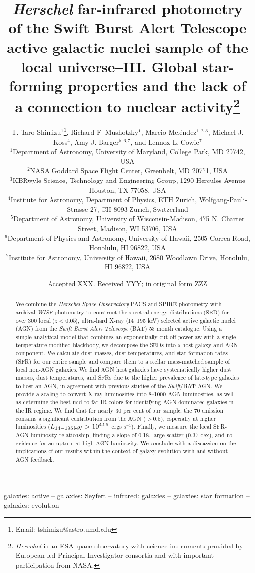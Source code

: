 \documentclass[fleqn, usenatbib]{mnras}
\title[\emph{Herschel}-BAT Sample: AGN-SF Connection]{\emph{Herschel} far-infrared photometry of the Swift Burst Alert
Telescope active galactic nuclei sample of the local universe--III. Global star-forming properties and the lack of a connection to nuclear activity\thanks{{\it Herschel} is an ESA space observatory with science instruments provided by European-led Principal Investigator consortia and with important participation from NASA.}}
\author[T. T. Shimizu]{T. Taro Shimizu$^{1}$\thanks{Email: tshimizu@astro.umd.edu}, Richard F. Mushotzky$^1$, Marcio Mel\'endez$^{1,2,3}$, Michael J. Koss$^{4}$, \newauthor Amy J. Barger$^{5,6,7}$, and Lennox L. Cowie$^{7}$\\
$^{1}$Department of Astronomy, University of Maryland, College Park, MD 20742, USA\\
$^{2}$NASA Goddard Space Flight Center,  Greenbelt, MD  20771, USA\\
$^{3}$KBRwyle Science, Technology and Engineering Group, 1290 Hercules Avenue  Houston, TX  77058, USA\\ 
$^{4}$Institute for Astronomy, Department of Physics, ETH Zurich, Wolfgang-Pauli-Strasse 27, CH-8093 Zurich, Switzerland\\
$^{5}$Department of Astronomy, University of Wisconsin-Madison, 475 N. Charter Street, Madison, WI 53706, USA\\
$^{6}$Department of Physics and Astronomy, University of Hawaii, 2505 Correa Road, Honolulu, HI 96822, USA\\
$^{7}$Institute for Astronomy, University of Hawaii, 2680 Woodlawn Drive, Honolulu, HI 96822, USA}
\date{Accepted XXX. Received YYY; in original form ZZZ}
\newcommand{\herschel}{\emph{Herschel}}
\newcommand{\swift}{\textit{Swift}}
\begin{document}
\label{firstpage}
\pagerange{\pageref{firstpage}--\pageref{lastpage}}
\maketitle

\begin{abstract}
We combine the \herschel{} \textit{Space Observatory} PACS and SPIRE photometry with archival \textit{WISE} photometry to construct the spectral energy distributions (SED) for over 300 local ($z < 0.05$), ultra-hard X-ray (14--195 keV) selected active galactic nuclei (AGN) from the \swift{} \textit{Burst Alert Telescope} (BAT) 58 month catalogue. Using a simple analytical model that combines an exponentially cut-off powerlaw with a single temperature modified blackbody, we decompose the SEDs into a host-galaxy and AGN component. We calculate dust masses, dust temperatures, and star-formation rates (SFR) for our entire sample and compare them to a stellar mass-matched sample of local non-AGN galaxies. We find AGN host galaxies have systematically higher dust masses, dust temperatures, and SFRs due to the higher prevalence of late-type galaxies to host an AGN, in agreement with previous studies of the \swift/BAT AGN. We provide a scaling to convert X-ray luminosities into 8--1000 \micron{} AGN luminosities, as well as determine the best mid-to-far IR colors for identifying AGN dominated galaxies in the IR regime. We find that for nearly 30 per cent of our sample, the 70 \micron{} emission contains a significant contribution from the AGN ($> 0.5$), especially at higher luminosities ($L_{14-195\,\rm{keV}} > 10^{42.5}$ ergs s$^{-1}$). Finally, we measure the local SFR-AGN luminosity relationship, finding a slope of 0.18, large scatter (0.37 dex), and no evidence for an upturn at high AGN luminosity. We conclude with a discussion on the implications of our results within the context of galaxy evolution with and without AGN feedback.
\end{abstract}

\begin{keywords}
galaxies: active -- galaxies: Seyfert -- infrared: galaxies -- galaxies: star formation -- galaxies: evolution 
\end{keywords}


\end{document}
